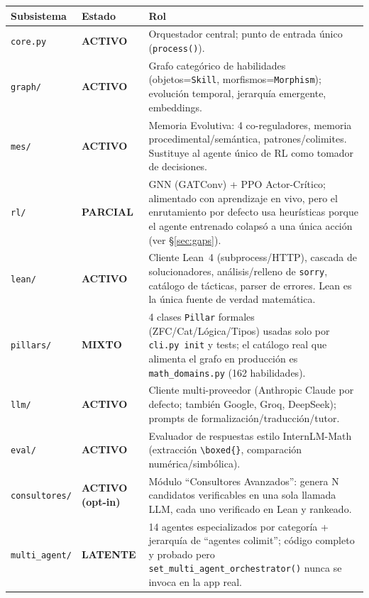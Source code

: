 \documentclass[11pt,a4paper]{report}
\newcommand{\code}[1]{\texttt{#1}}
\newcommand{\act}[1]{\textcolor{good}{\textbf{#1}}}
\newcommand{\parc}[1]{\textcolor{warn}{\textbf{#1}}}
\newcommand{\inerte}[1]{\textcolor{bad}{\textbf{#1}}}
\begin{document}
\begin{longtable}{@{}p{3.2cm}p{3cm}p{8.6cm}@{}}
\toprule
\textbf{Subsistema} & \textbf{Estado} & \textbf{Rol} \\
\midrule
\endhead
\code{core.py} & \act{ACTIVO} & Orquestador central; punto de entrada \'unico (\code{process()}). \\
\code{graph/} & \act{ACTIVO} & Grafo categ\'orico de habilidades (objetos=\code{Skill}, morfismos=\code{Morphism}); evoluci\'on temporal, jerarqu\'ia emergente, embeddings. \\
\code{mes/} & \act{ACTIVO} & Memoria Evolutiva: 4 co-reguladores, memoria procedimental/sem\'antica, patrones/colimites. Sustituye al agente \'unico de RL como tomador de decisiones. \\
\code{rl/} & \parc{PARCIAL} & GNN (GATConv) + PPO Actor-Cr\'itico; alimentado con aprendizaje en vivo, pero el enrutamiento por defecto usa heur\'isticas porque el agente entrenado colaps\'o a una \'unica acci\'on (ver \S\ref{sec:gaps}). \\
\code{lean/} & \act{ACTIVO} & Cliente Lean~4 (subprocess/HTTP), cascada de solucionadores, an\'alisis/relleno de \code{sorry}, cat\'alogo de t\'acticas, parser de errores. Lean es la \'unica fuente de verdad matem\'atica. \\
\code{pillars/} & \parc{MIXTO} & 4 clases \code{Pillar} formales (ZFC/Cat/L\'ogica/Tipos) usadas solo por \code{cli.py init} y tests; el cat\'alogo real que alimenta el grafo en producci\'on es \code{math\_domains.py} (162 habilidades). \\
\code{llm/} & \act{ACTIVO} & Cliente multi-proveedor (Anthropic Claude por defecto; tambi\'en Google, Groq, DeepSeek); prompts de formalizaci\'on/traducci\'on/tutor. \\
\code{eval/} & \act{ACTIVO} & Evaluador de respuestas estilo InternLM-Math (extracci\'on \code{\textbackslash boxed\{\}}, comparaci\'on num\'erica/simb\'olica). \\
\code{consultores/} & \act{ACTIVO (opt-in)} & M\'odulo ``Consultores Avanzados'': genera N candidatos verificables en una sola llamada LLM, cada uno verificado en Lean y rankeado. \\
\code{multi\_agent/} & \inerte{LATENTE} & 14 agentes especializados por categor\'ia + jerarqu\'ia de ``agentes colimit''; c\'odigo completo y probado pero \code{set\_multi\_agent\_orchestrator()} nunca se invoca en la app real. \\
\bottomrule
\end{longtable}
\end{document}
